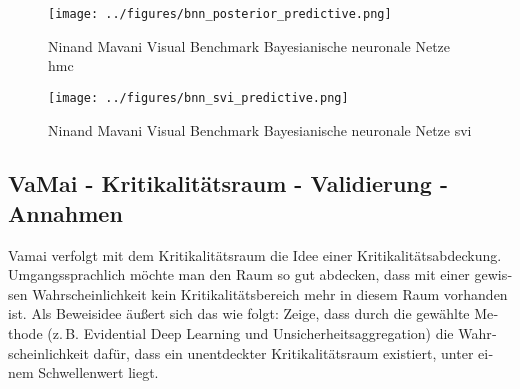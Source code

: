 \begin{otherlanguage}{ngerman}
\begin{figure}[!h]
  \centering
  \begin{minipage}{0.5\textwidth}
      \centering
      \texttt{[image: ../figures/bnn\_posterior\_predictive.png]}
      \caption{Ninand Mavani Visual Benchmark \gls{Bayesianische neuronale Netze} \gls{hmc}}
  \end{minipage}%
  \begin{minipage}{0.5\textwidth}
      \centering
      \texttt{[image: ../figures/bnn\_svi\_predictive.png]}
      \caption{Ninand Mavani Visual Benchmark \gls{Bayesianische neuronale Netze} \gls{svi}}
  \end{minipage}
\end{figure}







\subsection*{VaMai - Kritikalitätsraum - Validierung - Annahmen}

Vamai verfolgt mit dem Kritikalitätsraum die Idee einer Kritikalitätsabdeckung. Umgangssprachlich möchte man den Raum so gut abdecken, dass mit einer gewissen Wahrscheinlichkeit kein Kritikalitätsbereich mehr in diesem Raum vorhanden ist. Als Beweisidee äußert sich das wie folgt: Zeige, dass durch die gewählte Methode (z.\,B. Evidential Deep Learning und Unsicherheitsaggregation) die Wahrscheinlichkeit dafür, dass ein unentdeckter Kritikalitätsraum existiert, unter einem Schwellenwert liegt.


\end{otherlanguage}
